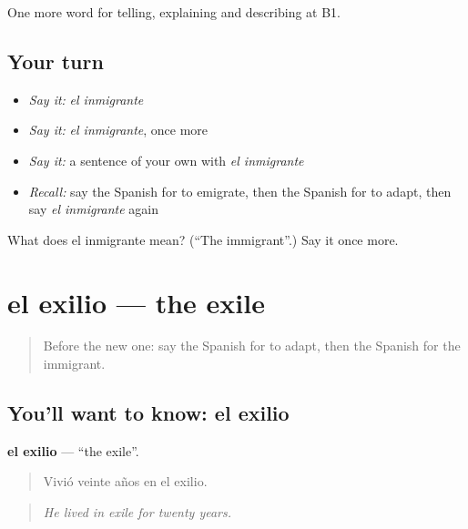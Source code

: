 \begin{grammarlens}[title={What you've built}]
One more word for telling, explaining and describing at B1.
\end{grammarlens}

\subsection*{Your turn}
\begin{itemize}
\raggedright
  \item \emph{Say it:} \emph{el inmigrante}
  \item \emph{Say it:} \emph{el inmigrante}, once more
  \item \emph{Say it:} a sentence of your own with \emph{el inmigrante}
  \item \emph{Recall:} say the Spanish for to emigrate, then the Spanish for to adapt, then say \emph{el inmigrante} again
\end{itemize}

\begin{tcolorbox}[breakable,colback=teal!4,colframe=teal!35!black,title={Before you move on}]
What does el inmigrante mean? (\textquotedblleft{}The immigrant\textquotedblright{}.) Say it once more.
\end{tcolorbox}
\section[el exilio]{el exilio — the exile}

\label{lesson:ES-C552-exilio}



\begin{quote}
Before the new one: say the Spanish for to adapt, then the Spanish for the immigrant.
\end{quote}

\subsection*{You'll want to know: el exilio}
\textbf{el exilio} — \textquotedblleft{}the exile\textquotedblright{}.

\begin{quote}
Vivió veinte años en el exilio.
\end{quote}

\begin{quote}
\emph{He lived in exile for twenty years.}
\end{quote}

